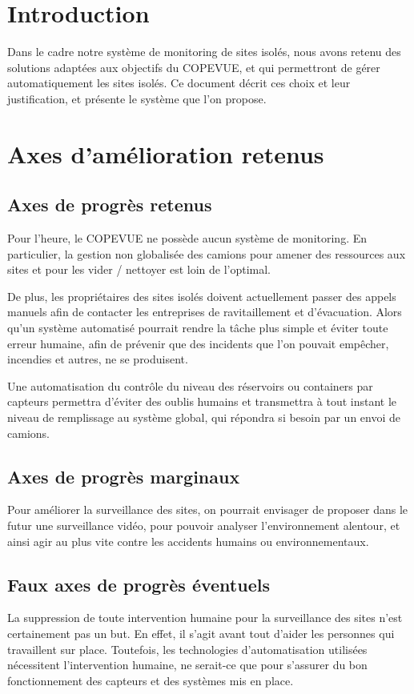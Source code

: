 \section{Introduction}
Dans le cadre notre système de monitoring de sites isolés, nous avons retenu des solutions adaptées aux objectifs du COPEVUE, et qui permettront de gérer automatiquement les sites isolés. Ce document décrit ces choix et leur justification, et présente le système que l’on propose.

\section{Axes d’amélioration retenus}
\subsection{Axes de progrès retenus}
Pour l’heure, le COPEVUE ne possède aucun système de monitoring. En particulier, la gestion non globalisée des camions pour amener des ressources aux sites et pour les vider /  nettoyer est loin de l’optimal.

De plus, les propriétaires des sites isolés doivent actuellement passer des appels manuels afin de contacter les entreprises de ravitaillement et d’évacuation. Alors qu’un système automatisé pourrait rendre la tâche plus simple et éviter toute erreur humaine, afin de prévenir que des incidents que l’on pouvait empêcher, incendies et autres, ne se produisent.

Une automatisation du contrôle du niveau des réservoirs ou containers par capteurs permettra d’éviter des oublis humains et transmettra à tout instant le niveau de remplissage au système global, qui répondra si besoin par un envoi de camions.
\subsection{Axes de progrès marginaux}
Pour améliorer la surveillance des sites, on pourrait envisager de proposer dans le futur une surveillance vidéo, pour pouvoir analyser l’environnement alentour, et ainsi agir au plus vite contre les accidents humains ou environnementaux.
\subsection{Faux axes de progrès éventuels}
La suppression de  toute intervention humaine pour la surveillance des sites n’est certainement pas un but. En effet, il s’agit avant tout d’aider les personnes qui travaillent sur place. Toutefois, les technologies d’automatisation utilisées nécessitent l’intervention humaine, ne serait-ce que pour s’assurer du bon fonctionnement des capteurs et des systèmes mis en place.

